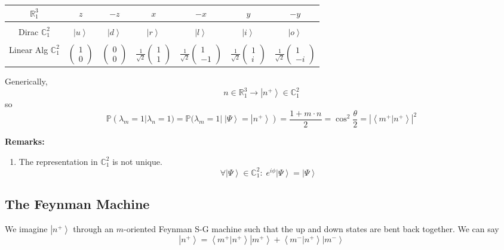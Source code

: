 \documentclass[12pt]{article}
\renewcommand{\P}{\mathbb{P}}
\newcommand{\R}{\mathbb{R}}
\newcommand{\brak}[1]{\left\langle #1 \right\rangle}
\newcommand{\C}{\mathbb{C}}
\newcommand{\ket}[1]{\left\vert #1 \right\rangle}
\begin{document}
\begin{center}
    \begin{tabular*}{5.24in}{|c|cccccc|}
        \hline
        $\R_1^3$ & $z$ & $-z$ & $x$ & $-x$ & $y$ & $-y$\\
        \hline
        &&&&&&\\
        Dirac $\C_1^2$ & $\ket{u}$ & $\ket{d}$& $\ket{r}$& $\ket{l}$& $\ket{i}$& $\ket{o}$\\
        &&&&&&\\
        Linear Alg $\C_1^2$ & $\begin{pmatrix}
            1\\0
        \end{pmatrix}$ & $\begin{pmatrix}
            0\\0
        \end{pmatrix}$& $\frac{1}{\sqrt 2}\begin{pmatrix}
            1\\1
        \end{pmatrix}$& $\frac{1}{\sqrt 2}\begin{pmatrix}
            1\\-1
        \end{pmatrix}$& $\frac{1}{\sqrt 2}\begin{pmatrix}
            1\\i
        \end{pmatrix}$& $\frac{1}{\sqrt 2}\begin{pmatrix}
            1\\-i
        \end{pmatrix}$\\
        \hline
    \end{tabular*}
\end{center}


Generically, 
\[n \in \R_1^3 \to \ket{n^+} \in \C_1^2\]
so 
\[\P(\lambda_m = 1 | \lambda_n = 1) = \P(\lambda_m = 1 | \; \ket{\Psi} = \ket{n^+}) = \frac{1+ m\cdot n}{2} = \cos^2 \frac{\theta}{2} = |\brak{m^+ | n^+}|^2\]

\textbf{Remarks:}
\begin{enumerate}
    \item The representation in $\C_1^2$ is not unique. 
    \[\forall \ket{\Psi} \in \C_1^2:\; e^{i\phi}\ket{\Psi} = \ket{\Psi}\]
\end{enumerate}

\subsection*{The Feynman Machine}
We imagine $\ket{n^+}$ through an $m$-oriented Feynman S-G machine such that the up and down states are bent back together. We can say 
\[\ket{n^+} = \brak{m^+ | n^+} \ket{m^+} + \brak{m^- | n^+}\ket{m^-}\]
\end{document}
